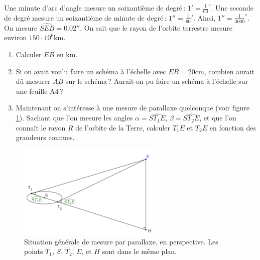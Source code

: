 		Une minute d’arc d’angle mesure un soixantième de degré\,: $1'=\frac{1}{60}^\circ$. Une seconde de degré mesure un soixantième de minute de degré\,: $1''=\frac{1}{60}'$. Ainsi, $1''=\frac{1}{3600}^\circ$. 
		On mesure $\widehat{SEB}=0.02''$. On sait que le rayon de l’orbite terrestre mesure environ $150\cdot 10^6$km.

		\begin{enumerate}
			\item Calculer $EB$ en km.
			\item Si on avait voulu faire un schéma à l’échelle avec $EB=20$cm, combien aurait dû mesurer $AB$ sur le schéma\,? Aurait-on pu faire un schéma à l’échelle sur une feuille A4\,?
			\item Maintenant on s'intéresse à une mesure de parallaxe quelconque (voir figure \ref{fig_par_vrai}). Sachant que l'on mesure les angles $\alpha=\widehat{ST_1E}$, $\beta=\widehat{ST_2E}$, et que l'on connaît le rayon $R$ de l'orbite de la Terre, calculer $T_1E$ et $T_2E$ en fonction des grandeurs connues.
		\end{enumerate}

		\begin{figure}
			\includegraphics[width=0.6\textwidth]{image/fct_trigo/fig1_parallaxe.png}
			\caption{Situation générale de mesure par parallaxe, en perspective. Les points $T_1$, $S$, $T_2$, $E$, et $H$ sont dans le même plan.}
			\label{fig_par_vrai}
		\end{figure}
